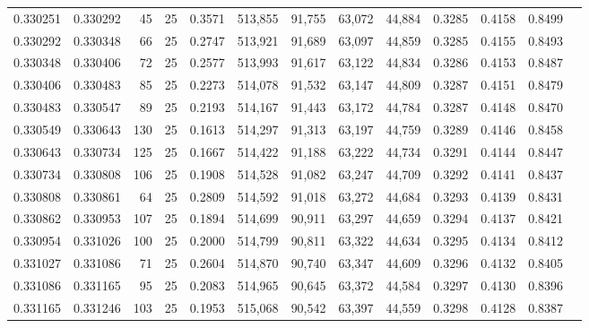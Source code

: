 \begin{tabular}{rrrrrrrrrrrrr}
0.330251 & 0.330292 &    45 &  25 &                                     0.3571 & 513,855 &  91,755 &  63,072 &  44,884 & 0.3285 & 0.4158 & 0.8499 \\
0.330292 & 0.330348 &    66 &  25 &                                     0.2747 & 513,921 &  91,689 &  63,097 &  44,859 & 0.3285 & 0.4155 & 0.8493 \\
0.330348 & 0.330406 &    72 &  25 &                                     0.2577 & 513,993 &  91,617 &  63,122 &  44,834 & 0.3286 & 0.4153 & 0.8487 \\
0.330406 & 0.330483 &    85 &  25 &                                     0.2273 & 514,078 &  91,532 &  63,147 &  44,809 & 0.3287 & 0.4151 & 0.8479 \\
0.330483 & 0.330547 &    89 &  25 &                                     0.2193 & 514,167 &  91,443 &  63,172 &  44,784 & 0.3287 & 0.4148 & 0.8470 \\
0.330549 & 0.330643 &   130 &  25 &                                     0.1613 & 514,297 &  91,313 &  63,197 &  44,759 & 0.3289 & 0.4146 & 0.8458 \\
0.330643 & 0.330734 &   125 &  25 &                                     0.1667 & 514,422 &  91,188 &  63,222 &  44,734 & 0.3291 & 0.4144 & 0.8447 \\
0.330734 & 0.330808 &   106 &  25 &                                     0.1908 & 514,528 &  91,082 &  63,247 &  44,709 & 0.3292 & 0.4141 & 0.8437 \\
0.330808 & 0.330861 &    64 &  25 &                                     0.2809 & 514,592 &  91,018 &  63,272 &  44,684 & 0.3293 & 0.4139 & 0.8431 \\
0.330862 & 0.330953 &   107 &  25 &                                     0.1894 & 514,699 &  90,911 &  63,297 &  44,659 & 0.3294 & 0.4137 & 0.8421 \\
0.330954 & 0.331026 &   100 &  25 &                                     0.2000 & 514,799 &  90,811 &  63,322 &  44,634 & 0.3295 & 0.4134 & 0.8412 \\
0.331027 & 0.331086 &    71 &  25 &                                     0.2604 & 514,870 &  90,740 &  63,347 &  44,609 & 0.3296 & 0.4132 & 0.8405 \\
0.331086 & 0.331165 &    95 &  25 &                                     0.2083 & 514,965 &  90,645 &  63,372 &  44,584 & 0.3297 & 0.4130 & 0.8396 \\
0.331165 & 0.331246 &   103 &  25 &                                     0.1953 & 515,068 &  90,542 &  63,397 &  44,559 & 0.3298 & 0.4128 & 0.8387 \\

\end{tabular}
